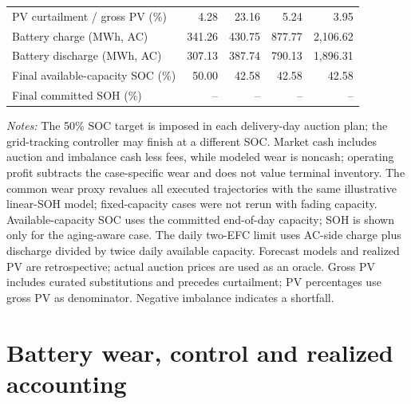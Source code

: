 \begin{table}[htbp]
{\begin{tabular}{lrrrr}
PV curtailment / gross PV (\%) & 4.28 & 23.16 & 5.24 & 3.95 \\
Battery charge (MWh, AC) & 341.26 & 430.75 & 877.77 & 2,106.62 \\
Battery discharge (MWh, AC) & 307.13 & 387.74 & 790.13 & 1,896.31 \\
Final available-capacity SOC (\%) & 50.00 & 42.58 & 42.58 & 42.58 \\
Final committed SOH (\%) & -- & -- & -- & -- \\
\hline
\end{tabular}%
}
\par\smallskip
\parbox{0.98\textwidth}{\footnotesize\textit{Notes:} The 50\% SOC target is imposed in each delivery-day auction plan; the grid-tracking controller may finish at a different SOC. Market cash includes auction and imbalance cash less fees, while modeled wear is noncash; operating profit subtracts the case-specific wear and does not value terminal inventory. The common wear proxy revalues all executed trajectories with the same illustrative linear-SOH model; fixed-capacity cases were not rerun with fading capacity. Available-capacity SOC uses the committed end-of-day capacity; SOH is shown only for the aging-aware case. The daily two-EFC limit uses AC-side charge plus discharge divided by twice daily available capacity. Forecast models and realized PV are retrospective; actual auction prices are used as an oracle. Gross PV includes curated substitutions and precedes curtailment; PV percentages use gross PV as denominator. Negative imbalance indicates a shortfall.}
\end{table}

\section{Battery wear, control and realized accounting}
